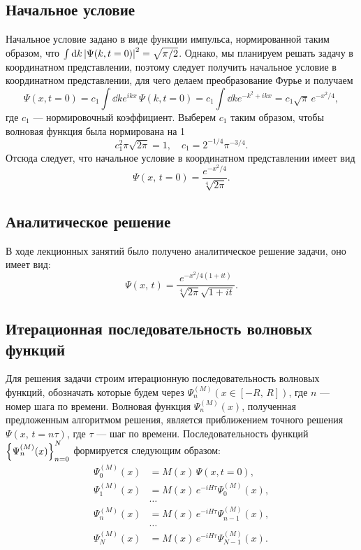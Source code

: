 \documentclass[10pt]{article}
\begin{document}
\subsection*{Начальное условие}
Начальное условие задано в виде функции импульса, нормированной таким образом, что $\int \dd{k} \abs{\Psi(k,t=0)}^2 = \sqrt{\pi/2}$. Однако, мы планируем решать задачу в координатном представлении, поэтому следует получить начальное условие в координатном представлении, для чего делаем преобразование Фурье и получаем
\begin{equation}
	\Psi(x,t=0) = c_1 \int \dd{k} e^{ikx}\, \Psi(k,t=0) = c_1 \int \dd{k} e^{-k^2+ikx} = c_1 \sqrt{\pi}\, e^{-x^2/4},
\end{equation}
где $c_1$ --- нормировочный коэффициент. Выберем $c_1$ таким образом, чтобы волновая функция была нормирована на 1
\begin{equation}
	c_1^2 \pi \sqrt{2\pi} = 1,\quad c_1 = 2^{-1/4} \pi^{-3/4}.
\end{equation}
Отсюда следует, что начальное условие в координатном представлении имеет вид
\begin{equation}
	\Psi(x,\,t=0) = \dfrac{e^{-x^2/4}}{\sqrt[4]{2\pi}}.
\end{equation}

\subsection*{Аналитическое решение}
В ходе лекционных занятий было получено аналитическое решение задачи, оно имеет вид:
\begin{equation}
	\Psi(x,\,t) = \dfrac{e^{-x^2/4(1+it)}}{\sqrt[4]{2\pi}\sqrt{1+it}}.
\end{equation}

\subsection*{Итерационная последовательность волновых функций}
Для решения задачи строим итерационную последовательность волновых функций, обозначать которые будем через $\Psi^{(M)}_n(x\in[-R,\,R])$, где $n$ --- номер шага по времени. Волновая функция $\Psi^{(M)}_n(x)$, полученная предложенным алгоритмом решения, является приближением точного решения $\Psi(x,\, t=n\tau)$, где $\tau$ --- шаг по времени. Последовательность функций $\qty{\Psi^{(M)}_n(x)}_{n=0}^{N}$ формируется следующим образом:
\begin{equation}
	\begin{split}
		\Psi^{(M)}_0(x) &= M(x)\, \Psi(x,t=0),\\
		\Psi^{(M)}_1(x) &= M(x)\, e^{-i H \tau} \Psi^{(M)}_0(x),\\
		&\ldots\\
		\Psi^{(M)}_n(x) &= M(x)\, e^{-i H \tau} \Psi^{(M)}_{n-1}(x),\\
		&\ldots\\
		\Psi^{(M)}_N(x) &= M(x)\, e^{-i H \tau} \Psi^{(M)}_{N-1}(x).
	\end{split}
\end{equation}
\end{document}
